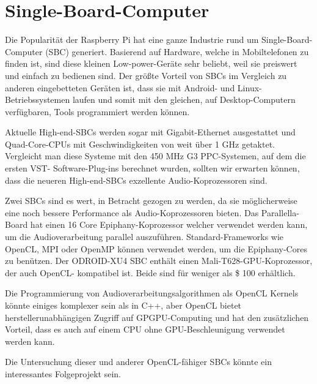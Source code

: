 \section{Single-Board-Computer}

Die Popularität der Raspberry Pi hat eine ganze Industrie rund um Single-Board-Computer (SBC) generiert. Basierend auf Hardware, welche in Mobiltelefonen zu finden ist, sind diese kleinen Low-power-Geräte sehr beliebt, weil sie preiswert und einfach zu bedienen sind. Der größte Vorteil von SBCs im Vergleich zu anderen eingebetteten Geräten ist, dass sie mit Android- und Linux-Betriebssystemen laufen  und somit mit den gleichen, auf Desktop-Computern verfügbaren, Tools programmiert werden können.

Aktuelle High-end-SBCs werden sogar mit Gigabit-Ethernet ausgestattet und Quad-Core-CPUs mit Geschwindigkeiten von weit über 1 GHz getaktet. Vergleicht man diese Systeme mit den 450 MHz G3 PPC-Systemen, auf dem die ersten VST- Software-Plug-ins berechnet wurden, sollten wir erwarten können, dass die neueren High-end-SBCs exzellente Audio-Koprozessoren sind.

Zwei SBCs sind es wert, in Betracht gezogen zu werden, da sie möglicherweise eine noch bessere Performance als Audio-Koprozessoren bieten. Das Parallella-Board hat einen 16 Core Epiphany-Koprozessor welcher verwendet werden kann, um die Audioverarbeitung parallel auszuführen. Standard-Frameworks wie OpenCL, MPI oder OpenMP können verwendet werden, um die Epiphany-Cores zu benützen. Der ODROID-XU4 SBC enthält einen Mali-T628-GPU-Koprozessor, der auch OpenCL- kompatibel ist. Beide sind für weniger als \$ 100 erhältlich.

Die Programmierung von Audioverarbeitungsalgorithmen als OpenCL Kernels könnte einiges komplexer sein als in C++, aber OpenCL bietet herstellerunabhängigen Zugriff auf GPGPU-Computing und hat den zusätzlichen Vorteil, dass es auch auf einem CPU ohne GPU-Beschleunigung verwendet werden kann.

Die Untersuchung dieser und anderer OpenCL-fähiger SBCs könnte ein interessantes Folgeprojekt sein.